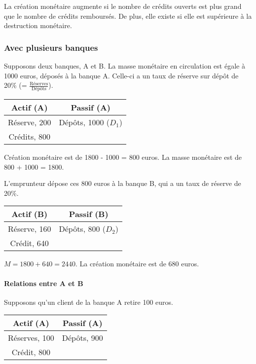 	La création monétaire augmente si le nombre de crédits ouverts est plus grand que le nombre de crédits remboursés. De plus, elle existe si elle est supérieure à la destruction monétaire.
	
	
	\subsubsection{Avec plusieurs banques}
	
	Supposons deux banques, A et B. La masse monétaire en circulation est égale à 1000 euros, déposés à la banque A. Celle-ci a un taux de réserve sur dépôt de 20\% (= $\frac{\text{Réserves}}{\text{Dépôts}}$).
	
\begin{center}
	\begin{tabular}{c|c}
	Actif (A) & Passif (A)\\ 
	\hline 
	Réserve, 200 & Dépôts, 1000 ($D_1$) \\ 
	Crédits, 800 &  
	\end{tabular} 
\end{center}
	
	Création monétaire est de 1800 - 1000 = 800 euros. La masse monétaire est de 800 + 1000 = 1800.
	
	L'emprunteur dépose ces 800 euros à la banque B, qui a un taux de réserve de 20\%.
	
\begin{center}
	\begin{tabular}{c|c}
	Actif (B) & Passif (B) \\ 
	\hline 
	Réserve, 160 & Dépôts, 800 ($D_2$) \\ 
	Crédit, 640 &  
	\end{tabular} 
\end{center}
	
	$M = 1800 + 640 = 2440$. La création monétaire est de 680 euros.
	
	\paragraph{Relations entre A et B}
	
	Supposons qu'un client de la banque A retire 100 euros.
	
\begin{center}
	\begin{tabular}{c|c}
	Actif (A) & Passif (A) \\ 
	\hline 
	Réserves, 100 & Dépôts, 900 \\ 
	Crédit, 800 &  
	\end{tabular} 
\end{center}
	
